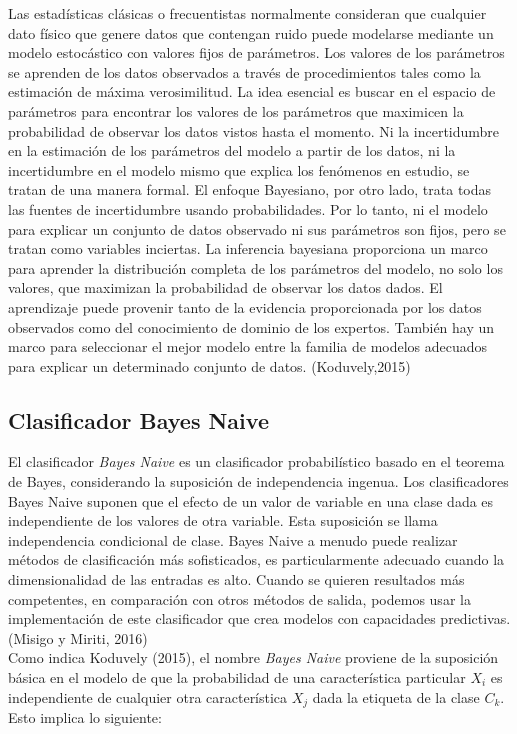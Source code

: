 Las estadísticas clásicas o frecuentistas normalmente consideran que cualquier dato físico que genere datos que contengan ruido puede modelarse mediante un modelo estocástico con valores fijos de parámetros. Los valores de los parámetros se aprenden de los datos observados a través de procedimientos tales como la estimación de máxima verosimilitud. La idea esencial es buscar en el espacio de parámetros para encontrar los valores de los parámetros que maximicen la probabilidad de observar los datos vistos hasta el momento. Ni la incertidumbre en la estimación de los parámetros del modelo a partir de los datos, ni la incertidumbre en el modelo mismo que explica los fenómenos en estudio, se tratan de una manera formal. El enfoque Bayesiano, por otro lado, trata todas las fuentes de incertidumbre usando probabilidades. Por lo tanto, ni el modelo para explicar un conjunto de datos observado ni sus parámetros son fijos, pero se tratan como variables inciertas. La inferencia bayesiana proporciona un marco para aprender la distribución completa de los parámetros del modelo, no solo los valores, que maximizan la probabilidad de observar los datos dados. El aprendizaje puede provenir tanto de la evidencia proporcionada por los datos observados como del conocimiento de dominio de los expertos. También hay un marco para seleccionar el mejor modelo entre la familia de modelos adecuados para explicar un determinado conjunto de datos. (Koduvely,2015)


\subsection{Clasificador Bayes Naive}

El clasificador \textit{Bayes Naive} es un clasificador probabilístico basado en el teorema de Bayes, considerando la suposición de independencia ingenua. Los clasificadores Bayes Naive suponen que el efecto de un valor de variable en una clase dada es independiente de los valores de otra variable. Esta suposición se llama independencia condicional de clase. Bayes Naive a menudo puede realizar métodos de clasificación más sofisticados, es particularmente adecuado cuando la dimensionalidad de las entradas es alto. Cuando se quieren resultados más competentes, en comparación con otros métodos de salida, podemos usar la implementación de este clasificador que crea modelos con capacidades predictivas.(Misigo y Miriti, 2016)\\

Como indica Koduvely (2015), el nombre \textit{Bayes Naive} proviene de la suposición básica en el modelo de que la probabilidad de una característica particular $X_{i}$ es independiente de cualquier otra característica $X_{j}$ dada la etiqueta de la clase $C_{k}$. Esto implica lo siguiente:

